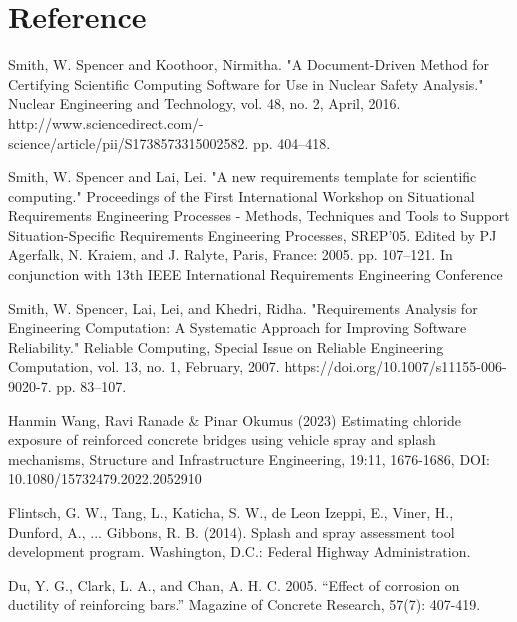 \documentclass[12pt]{article}
\newcounter{refnum} %
\begin{document}
\newpage
\section*{Reference}
\begin{enumerate}[label={[\arabic*]}]
\item {} \label{ref1}
Smith, W. Spencer and Koothoor, Nirmitha. "A Document-Driven Method for Certifying Scientific Computing Software for Use in Nuclear Safety Analysis." Nuclear Engineering and Technology, vol. 48, no. 2, April, 2016. http://www.sciencedirect.com/-\\science/article/pii/S1738573315002582. pp. 404–418.

\item {} \label{ref2}
Smith, W. Spencer and Lai, Lei. "A new requirements template for scientific computing." Proceedings of the First International Workshop on Situational Requirements Engineering Processes - Methods, Techniques and Tools to Support Situation-Specific Requirements Engineering Processes, SREP'05. Edited by PJ Agerfalk, N. Kraiem, and J. Ralyte, Paris, France: 2005. pp. 107–121. In conjunction with 13th IEEE International Requirements Engineering Conference

\item {} \label{ref3}
Smith, W. Spencer, Lai, Lei, and Khedri, Ridha. "Requirements Analysis for Engineering Computation: A Systematic Approach for Improving Software Reliability." Reliable Computing, Special Issue on Reliable Engineering Computation, vol. 13, no. 1, February, 2007. https://doi.org/10.1007/s11155-006-9020-7. pp. 83–107.

\item {} \label{ref4}
Hanmin Wang, Ravi Ranade \& Pinar Okumus (2023) Estimating chloride exposure of reinforced concrete bridges using vehicle spray and splash mechanisms, Structure and Infrastructure Engineering, 19:11, 1676-1686, DOI: 10.1080/15732479.2022.2052910

\item {} \label{ref5}
Flintsch, G. W., Tang, L., Katicha, S. W., de Leon Izeppi, E., Viner, H., Dunford, A., ... Gibbons, R. B. (2014). Splash and spray assessment tool development program. Washington, D.C.: Federal Highway Administration.

\item {} \label{ref6}
Du, Y. G., Clark, L. A., and Chan, A. H. C. 2005. “Effect of corrosion on ductility of reinforcing bars.” Magazine of Concrete Research, 57(7): 407-419.


\end{enumerate}
\end{document}
